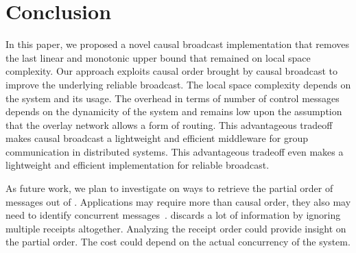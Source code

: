 
\section{Conclusion}
\label{sec:conclusion}


In this paper, we proposed a novel causal broadcast implementation that removes
the last linear and monotonic upper bound that remained on local space
complexity. Our approach exploits causal order brought by causal broadcast to
improve the underlying reliable broadcast. The local space complexity depends on
the system and its usage. The overhead in terms of number of control messages
depends on the dynamicity of the system and remains low upon the assumption that
the overlay network allows a form of routing.
This advantageous tradeoff makes causal broadcast a lightweight and efficient
middleware for group communication in distributed systems. This advantageous
tradeoff even makes \RPCBROADCAST a lightweight and efficient implementation for
reliable broadcast. %

As future work, we plan to investigate on ways to retrieve the partial order of
messages out of \RPCBROADCAST. %
Applications may require more than causal order, they also may need to identify
concurrent messages~\cite{sun2009contextbased}. \RPCBROADCAST discards a lot of
information by ignoring multiple receipts altogether. Analyzing the receipt
order could provide insight on the partial order. The cost could depend on the
actual concurrency of the system.

